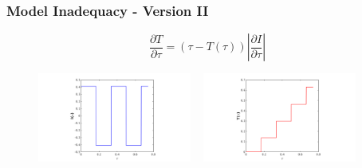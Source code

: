 \documentclass[10pt,xcolor=dvipsnames,compress]{beamer}
\begin{document}
\begin{frame}
\frametitle{Model Inadequacy - Version II}
\vfill

 
\begin{equation*}
\frac{\partial T}{\partial\tau} = (\tau - T(\tau)) \left| \frac{\partial I}{\partial\tau} \right|
\end{equation*}


\begin{figure}[h]
    \centering
    \includegraphics[trim = 3.8in 0.2in 4.3in 0.2in, clip, width=0.45\textwidth]{figs/Istep.png} 
    ~
    \includegraphics[trim = 3.8in 0.2in 4.3in 0.2in, clip, width=0.45\textwidth]{figs/Tstep.png}
        \vspace{-3mm}
\end{figure}


\vfill
\end{frame}
\end{document}

